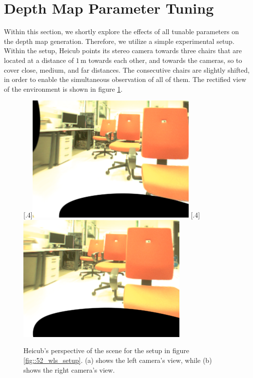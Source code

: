 \section{Depth Map Parameter Tuning}
\label{sec::52_dm}
Within this section, we shortly explore the effects of all tunable parameters on the depth map generation. Therefore, we utilize a simple experimental setup.
Within the setup, Heicub points its stereo camera towards three chairs that are located at a distance of $1\,\text{m}$ towards each other, and towards the cameras, so to cover close, medium, and far distances. The consecutive chairs are slightly shifted, in order to enable the simultaneous observation of all of them. The rectified view of the environment is shown in figure \ref{fig::52_wls_rgb}.
\begin{figure}[h]
	\centering
	\subcaptionbox{}%
	[.4\linewidth]{\includegraphics[scale=.3]{chapters/05_experiments/02_depth_map_parameter_tuning/l_rgb.png}}
	\subcaptionbox{}%
	[.4\linewidth]{\includegraphics[scale=.3]{chapters/05_experiments/02_depth_map_parameter_tuning/r_rgb.png}}
	\caption{Heicub's perspective of the scene for the setup in figure \ref{fig::52_wls_setup}. (a) shows the left camera's view, while (b) shows the right camera's view.}
	\label{fig::52_wls_rgb}
\end{figure}
